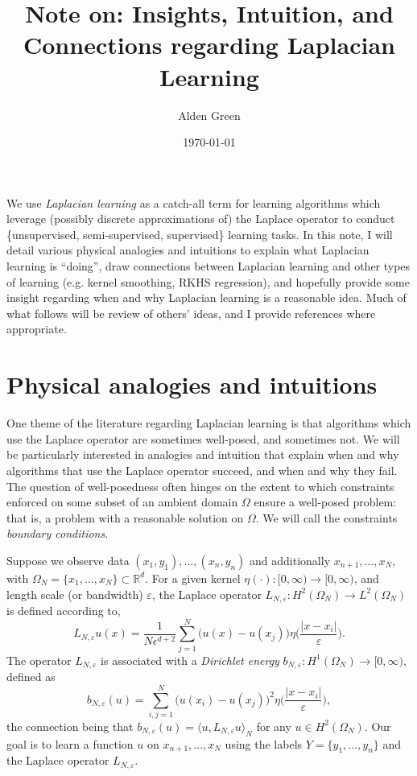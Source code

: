 \documentclass{article}
\newcommand{\Reals}{\mathbb{R}}
\newcommand{\1}{\mathbf{1}}
\newcommand{\Rd}{\Reals^d}
\newcommand{\dotp}[2]{\langle #1, #2 \rangle}
\theoremstyle{definition}
\theoremstyle{remark}
\begin{document}
\title{Note on: Insights, Intuition, and Connections regarding Laplacian Learning}
\author{Alden Green}
\date{\today}
\maketitle

We use \emph{Laplacian learning} as a catch-all term for learning algorithms which leverage (possibly discrete approximations of) the Laplace operator to conduct \{unsupervised, semi-supervised, supervised\} learning tasks. In this note, I will detail various physical analogies and intuitions to explain what Laplacian learning is ``doing'', draw connections between Laplacian learning and other types of learning (e.g. kernel smoothing, RKHS regression), and hopefully provide some insight regarding when and why Laplacian learning is a reasonable idea. Much of what follows will be review of others' ideas, and I provide references where appropriate.

\section{Physical analogies and intuitions} 
One theme of the literature regarding Laplacian learning is that algorithms which use the Laplace operator are sometimes well-posed, and sometimes not. We will be particularly interested in analogies and intuition that explain when and why algorithms that use the Laplace operator succeed, and when and why they fail. The question of well-posedness often hinges on the extent to which constraints enforced on some subset of an ambient domain $\Omega$ ensure a well-posed problem: that is, a problem with a reasonable solution on $\Omega$. We will call the constraints \emph{boundary conditions}. 

Suppose we observe data $(x_1,y_1),\ldots,(x_n,y_n)$ and additionally $x_{n + 1},\ldots,x_{N}$, with $\Omega_N = \{x_1,\ldots,x_N\} \subset \Rd$. For a given kernel $\eta(\cdot): [0,\infty) \to [0,\infty)$, and length scale (or bandwidth) $\varepsilon$, the Laplace operator $L_{N,\varepsilon}: H^2(\Omega_N) \to L^2(\Omega_N)$ is defined according to, 
\begin{equation*}
L_{N,\varepsilon}u(x) = \frac{1}{N\epsilon^{d + 2}}\sum_{j = 1}^{N} \bigl(u(x) - u(x_j)\bigr)\eta\biggl(\frac{|x - x_i|}{\varepsilon}\biggr).
\end{equation*}
The operator $L_{N,\varepsilon}$ is associated with a \emph{Dirichlet energy} $b_{N,\varepsilon}: H^1(\Omega_N) \to [0,\infty)$, defined as 
\begin{equation*}
b_{N,\varepsilon}(u) = \sum_{i,j = 1}^{N} \bigl(u(x_i) - u(x_j)\bigr)^2 \eta\biggl(\frac{|x - x_i|}{\varepsilon}\biggr),
\end{equation*}
the connection being that $b_{N,\varepsilon}(u) = \dotp{u}{L_{N,\varepsilon}u}_{N}$ for any $u \in H^2(\Omega_N)$. Our goal is to learn a function $u$ on $x_{n + 1},\ldots,x_{N}$ using the labels $Y = \{y_1,\ldots,y_n\}$ and the Laplace operator $L_{N,\varepsilon}$. 
\end{document}
